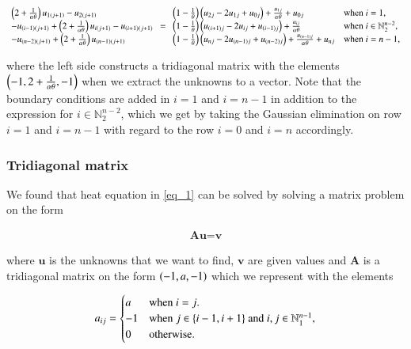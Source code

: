 \documentclass[11pt,english,a4paper]{article}
\begin{document}
\begin{flushleft}
\begin{align}
\begin{array}{l} \left({2+\frac{1}{\alpha \theta}}\right)u_{1(j+1)} - u_{2(j+1)} \\  -u_{(i-1)(j+1)} +\left({2+\frac{1}{\alpha \theta}}\right)u_{i(j+1)} - u_{(i+1)(j+1)} \\ -u_{(n-2)(j+1)} +\left({2+\frac{1}{\alpha \theta}}\right)u_{(n-1)(j+1)} \end{array} = \begin{array}{ll} \left({1-\frac{1}{\theta}}\right)\left({u_{2j} - 2u_{1j} + u_{0j}}\right) + \frac{u_{1j}}{\alpha\theta} + u_{0j} & \text{when $i=1$,} \\ \left({1-\frac{1}{\theta}}\right)\left({u_{(i+1)j} - 2u_{ij} + u_{(i-1)j}}\right) + \frac{u_{ij}}{\alpha\theta} & \text{when $i\in\mathbb{N}_2^{n-2}$,}\\ \left({1-\frac{1}{\theta}}\right)\left({u_{nj} - 2u_{(n-1)j} + u_{(n-2)j}}\right) + \frac{u_{(n-1)j}}{\alpha\theta} + u_{nj} & \text{when $i=n-1$,}\end{array}
\label{eq_18}
\end{align}

where the left side constructs a tridiagonal matrix with the elements $\left({-1,2+\frac{1}{\alpha\theta},-1}\right)$ when we extract the unknowns to a vector. Note that the boundary conditions are added in $i=1$ and $i=n-1$  in addition to the expression for $i\in\mathbb{N}_2^{n-2}$, which we get by taking the Gaussian elimination on row $i=1$ and $i=n-1$ with regard to the row $i=0$ and $i=n$ accordingly.

\subsubsection{Tridiagonal matrix}

We found that heat equation in \eqref{eq_1} can be solved by solving a matrix problem on the form

\begin{align*}
\textbf{A}\textbf{u} = \textbf{v}
\end{align*} 

where $\textbf{u}$ is the unknowns that we want to find, $\textbf{v}$ are given values and $\textbf{A}$ is a tridiagonal matrix on the form $\left({-1,a,-1}\right)$ which we represent with the elements

\begin{align*}
a_{ij} = \begin{cases} a & \text{when $i=j$.} \\ -1 &\text{when $j\in\left\lbrace{i-1,i+1}\right\rbrace$ and $i,j\in\mathbb{N}_1^{n-1}$,} \\ 0 & \text{otherwise.}\end{cases}
\end{align*}


\end{flushleft}
\end{document}

